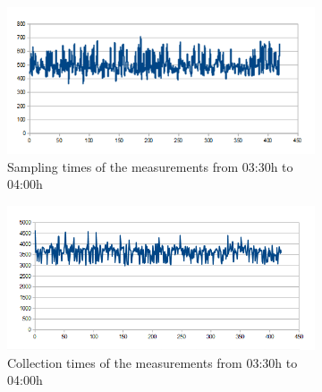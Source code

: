 \begin{figure}[htbp]
	\centering
	\begin{subfigure}[t]{1\textwidth}
		\centering
    		\includegraphics[scale=0.75]{content/images/Experiment/NightRounds}
   	 	\caption{Sampling times of the measurements from 03:30h to 04:00h}
    	\label{fig:nightR}
    \end{subfigure}
 
    \begin{subfigure}[t]{1\textwidth}
		\centering         
        \includegraphics[scale=0.75]{content/images/Experiment/NightCollection}
        \caption{Collection times of the measurements from 03:30h to 04:00h}
        \label{fig:nightC}
    \end{subfigure}
    \caption{}
\end{figure}

